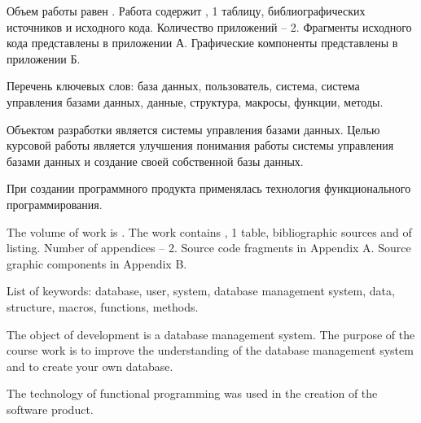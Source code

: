 
Объем работы равен . Работа содержит , 1 таблицу,  библиографических источников и  исходного кода. Количество приложений – 2. Фрагменты исходного кода представлены в приложении А. Графические компоненты представлены в приложении Б.

Перечень ключевых слов: база данных, пользователь, система, система управления базами данных, данные, структура, макросы, функции, методы.

Объектом разработки является системы управления базами данных.
Целью курсовой работы является улучшения понимания работы системы управления базами данных и создание своей собственной базы данных.

При создании программного продукта применялась технология функционального программирования.

  
The volume of work is . The work contains , 1 table,  bibliographic sources and  of listing. Number of appendices – 2. Source code fragments in Appendix A. Source graphic components in Appendix B.

List of keywords: database, user, system, database management system, data, structure, macros, functions, methods.

The object of development is a database management system.
The purpose of the course work is to improve the understanding of the database management system and to create your own database.

The technology of functional programming was used in the creation of the software product.
